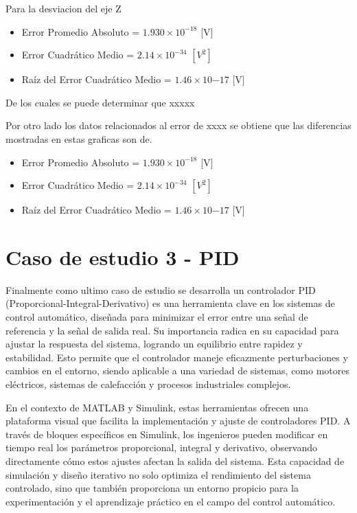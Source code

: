 Para la desviacion del eje Z


\begin{itemize}
    \item Error Promedio Absoluto = $1.930 \times 10^{-18}$ [V]
    \item Error Cuadrático Medio = $2.14 \times 10^{-34}$ $[V^{2}]$
    \item Raíz del Error Cuadrático Medio = $1.46 \times 10{-17}$ [V]
\end{itemize}


De los cuales se puede determinar que xxxxx


Por otro lado los datos relacionados al error de xxxx se obtiene que las diferencias mostradas en estas graficas son de.


\begin{itemize}
    \item Error Promedio Absoluto = $1.930 \times 10^{-18}$ [V]
    \item Error Cuadrático Medio = $2.14 \times 10^{-34}$ $[V^{2}]$
    \item Raíz del Error Cuadrático Medio = $1.46 \times 10{-17}$ [V]
\end{itemize}


\section{Caso de estudio 3 - PID}

Finalmente como ultimo caso de estudio se desarrolla un controlador PID (Proporcional-Integral-Derivativo) es una herramienta clave en los sistemas de control automático, diseñada para minimizar el error entre una señal de referencia y la señal de salida real. Su importancia radica en su capacidad para ajustar la respuesta del sistema, logrando un equilibrio entre rapidez y estabilidad. Esto permite que el controlador maneje eficazmente perturbaciones y cambios en el entorno, siendo aplicable a una variedad de sistemas, como motores eléctricos, sistemas de calefacción y procesos industriales complejos.

En el contexto de MATLAB y Simulink, estas herramientas ofrecen una plataforma visual que facilita la implementación y ajuste de controladores PID. A través de bloques específicos en Simulink, los ingenieros pueden modificar en tiempo real los parámetros proporcional, integral y derivativo, observando directamente cómo estos ajustes afectan la salida del sistema. Esta capacidad de simulación y diseño iterativo no solo optimiza el rendimiento del sistema controlado, sino que también proporciona un entorno propicio para la experimentación y el aprendizaje práctico en el campo del control automático.


